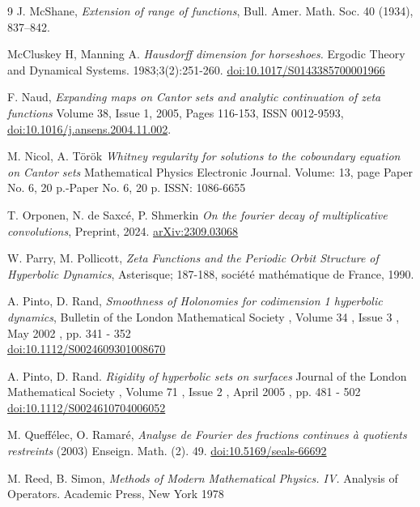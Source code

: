 \documentclass[a4paper]{article}
\theoremstyle{definition}
\begin{document}
\begin{thebibliography}{9}
    {J. McShane},
    \emph{Extension of range of functions},
    Bull. Amer. Math. Soc. 40 (1934), 837–842.

    {McCluskey H, Manning A.}
    \emph{Hausdorff dimension for horseshoes.}
    Ergodic Theory and Dynamical Systems. 1983;3(2):251-260. \href{https://doi.org/10.1017/S0143385700001966}{doi:10.1017/S0143385700001966}


    {F. Naud},
    \emph{Expanding maps on Cantor sets and analytic continuation of zeta functions}
    Volume 38, Issue 1, 2005, Pages 116-153, ISSN 0012-9593, \href{https://doi.org/10.1016/j.ansens.2004.11.002}{doi:10.1016/j.ansens.2004.11.002}.   

    {M. Nicol, A. Török}
    \emph{Whitney regularity for solutions to the coboundary equation on Cantor sets} Mathematical Physics Electronic Journal. Volume: 13, page Paper No. 6, 20 p.-Paper No. 6, 20 p.
    ISSN: 1086-6655


    {T. Orponen, N. de Saxcé, P. Shmerkin}
    \emph{On the fourier decay of multiplicative convolutions}, Preprint, 2024. \href{https://arxiv.org/abs/2309.03068}{arXiv:2309.03068}

    {W. Parry, M. Pollicott},
    \emph{Zeta Functions and the Periodic Orbit Structure of Hyperbolic Dynamics},
    Asterisque; 187-188, société mathématique de France, 1990.


    {A. Pinto, D. Rand},
    \emph{Smoothness of Holonomies for codimension 1 hyperbolic dynamics},
      Bulletin of the London Mathematical Society , Volume 34 , Issue 3 , May 2002 , pp. 341 - 352 \\ \href{https://doi.org/10.1112/S0024609301008670}{doi:10.1112/S0024609301008670}

    {A. Pinto, D. Rand}.
    \emph{Rigidity of hyperbolic sets on surfaces}
    Journal of the London Mathematical Society , Volume 71 , Issue 2 , April 2005 , pp. 481 - 502
    \href{https://doi.org/10.1112/S0024610704006052}{doi:10.1112/S0024610704006052}


    {M. Queffélec, O. Ramaré},
    \emph{Analyse de Fourier des fractions continues à quotients restreints}
    (2003) Enseign. Math. (2). 49. \href{https://www.e-periodica.ch/digbib/view?pid=ens-001:2003:49::251#684}{doi:10.5169/seals-66692}



    {M. Reed, B. Simon}, 
    \emph{Methods of Modern Mathematical Physics. IV.}
    Analysis of Operators. Academic Press, New York 1978




\end{thebibliography}
\end{document}
